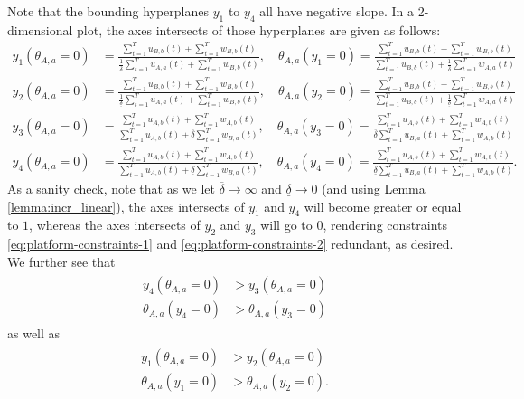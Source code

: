 \documentclass[letterpaper]{article} %
\begin{document}
Note that the bounding hyperplanes $y_1$ to $y_4$ all have negative slope.
%
In a 2-dimensional plot, the axes intersects of those hyperplanes are given as follows:
\begin{align*}
    y_1(\theta_{A,a}=0) &= \frac{\sum_{t=1}^T u_{B,b}(t) + \sum_{t=1}^T w_{B,b}(t)}{\frac{1}{\overline{\delta}}\sum_{t=1}^T u_{A,a}(t) + \sum_{t=1}^T w_{B,b}(t)}, \quad \theta_{A,a}(y_1=0) = \frac{\sum_{t=1}^T u_{B,b}(t) + \sum_{t=1}^T w_{B,b}(t)}{\sum_{t=1}^T u_{B,b}(t) + \frac{1}{\overline{\delta}} \sum_{t=1}^T w_{A,a}(t)} \\
    y_2(\theta_{A,a}=0) &= \frac{\sum_{t=1}^T u_{B,b}(t) + \sum_{t=1}^T w_{B,b}(t)}{\frac{1}{\underline{\delta}}\sum_{t=1}^T u_{A,a}(t) + \sum_{t=1}^T w_{B,b}(t)}, \quad \theta_{A,a}(y_2=0) = \frac{\sum_{t=1}^T u_{B,b}(t) + \sum_{t=1}^T w_{B,b}(t)}{\sum_{t=1}^T u_{B,b}(t) + \frac{1}{\underline{\delta}} \sum_{t=1}^T w_{A,a}(t)} \\
    y_3(\theta_{A,a}=0) &= \frac{\sum_{t=1}^T u_{A,b}(t) + \sum_{t=1}^T w_{A,b}(t)}{\sum_{t=1}^T u_{A,b}(t) + \overline{\delta}\sum_{t=1}^T w_{B,a}(t)}, \quad \theta_{A,a}(y_3=0) = \frac{\sum_{t=1}^T u_{A,b}(t) + \sum_{t=1}^T w_{A,b}(t)}{\overline{\delta}\sum_{t=1}^T u_{B,a}(t) + \sum_{t=1}^T w_{A,b}(t)} \\
    y_4(\theta_{A,a}=0) &= \frac{\sum_{t=1}^T u_{A,b}(t) + \sum_{t=1}^T w_{A,b}(t)}{\sum_{t=1}^T u_{A,b}(t) + \underline{\delta}\sum_{t=1}^T w_{B,a}(t)}, \quad \theta_{A,a}(y_4=0) = \frac{\sum_{t=1}^T u_{A,b}(t) + \sum_{t=1}^T w_{A,b}(t)}{\underline{\delta}\sum_{t=1}^T u_{B,a}(t) + \sum_{t=1}^T w_{A,b}(t)}.
\end{align*}
\normalsize
As a sanity check, note that as we let $\overline{\delta} \to \infty$ and $\underline{\delta} \to 0$ (and using Lemma \ref{lemma:incr_linear}), the axes intersects of $y_1$ and $y_4$ will become greater or equal to $1$, whereas the axes intersects of $y_2$ and $y_3$ will go to $0$, rendering constraints \eqref{eq:platform-constraints-1} and \eqref{eq:platform-constraints-2} redundant, as desired.
%
We further see that
\begin{align}\label{eq:intersect_magenta}
\begin{split}
    y_4(\theta_{A,a}=0) &> y_3(\theta_{A,a}=0) \\
    \theta_{A,a}(y_4=0) &> \theta_{A,a}(y_3=0)
\end{split}
\end{align}
as well as
\begin{align}\label{eq:y_1_greater_y_2}
\begin{split}
    y_1(\theta_{A,a}=0) &> y_2(\theta_{A,a}=0) \\
    \theta_{A,a}(y_1=0) &> \theta_{A,a}(y_2=0).
\end{split}
\end{align}
\end{document}
